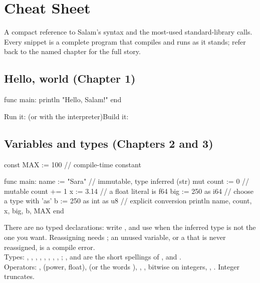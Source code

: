 \chapter{Cheat Sheet}%
\label{app:cheatsheet}

A compact reference to Salam's syntax and the most-used standard-library calls.
Every snippet is a complete program that compiles and runs as it stands; refer
back to the named chapter for the full story.

\section*{Hello, world (Chapter 1)}

\begin{salamen}
func main:
    println "Hello, Salam!"
end
\end{salamen}

\noindent Run it:  (or 
with the interpreter)\quad Build it: 

\section*{Variables and types (Chapters 2 and 3)}

\begin{salamen}
const MAX := 100                // compile-time constant

func main:
    name := "Sara"              // immutable, type inferred (str)
    mut count := 0              // mutable
    count += 1
    x := 3.14                   // a float literal is f64
    big := 250 as i64           // choose a type with 'as'
    b := 250 as int as u8       // explicit conversion
    println name, count, x, big, b, MAX
end
\end{salamen}

\noindent There are no typed declarations: write , and use
 when the inferred type is not the one you want. Reassigning needs
; an unused variable, or a  that is never reassigned, is a
compile error. \\
Types: , , ,
, , , , ,
; ,  and  are the short spellings of
,  and . \\
Operators: \code{+ - * / \%}, \code{**} (power, float), \code{== != < > <= >=}
(or the words ), ,
, bitwise \code{\& | \textasciicircum{} \textasciitilde{} << >>} on integers,
\code{+= -= *= /= \%= **=}, \code{++ --}. Integer \code{/} truncates.

